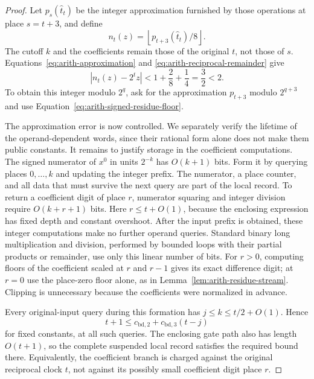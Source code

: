 \documentclass[11pt]{article}
\numberwithin{equation}{section}
\theoremstyle{definition}
\theoremstyle{remark}
\begin{document}
\begin{proof}
Let ${p}_s(\widehat {t}_t)$ be the integer approximation furnished by
those operations at place $s=t+3$, and define
\begin{equation}
 {n}_t(z)=\left\lfloor {p}_{t+3}(\widehat {t}_t)/8\right\rfloor.
 \label{eq:arith-reciprocal-approximation}
\end{equation}
The cutoff $k$ and the coefficients remain those of the original $t$,
not those of $s$.  Equations~\eqref{eq:arith-approximation} and
\eqref{eq:arith-reciprocal-remainder} give
\[
 |{n}_t(z)-2^tz|<1+\frac28+\frac14=\frac32<2.
\]
To obtain this integer modulo $2^q$, ask for the approximation
${p}_{t+3}$ modulo $2^{q+3}$ and use
Equation~\eqref{eq:arith-signed-residue-floor}.

The approximation error is now controlled. We separately verify the lifetime of the operand-dependent words, since their rational form alone does not make them public constants. It remains to justify storage in the coefficient computations.
The signed numerator of $x^0$ in units $2^{-k}$ has $O(k+1)$
bits.  Form it by querying places $0,\ldots,k$ and updating the
integer prefix.  The numerator, a place counter, and all data that
must survive the next query are part of the local record.
To return a coefficient digit of place $r$, numerator squaring and
integer division require $O(k+r+1)$ bits.  Here $r\leq t+O(1)$,
because the enclosing expression has fixed depth and constant
overshoot.  After the input prefix is obtained, these integer
computations make no further operand queries.  Standard binary
long multiplication and division, performed by bounded loops with
their partial products or remainder, use only this linear number
of bits.  For $r>0$, computing floors of the coefficient scaled at
$r$ and $r-1$ gives its exact difference digit; at $r=0$ use the
place-zero floor alone, as in Lemma~\ref{lem:arith-residue-stream}.
Clipping is unnecessary
because the coefficients were normalized in advance.

Every original-input query during this formation has
$j\leq k\leq t/2+O(1)$.  Hence
\begin{equation}
 t+1\leq {c_{\mathrm{bd},2}}+{c_{\mathrm{bd},3}}(t-j)
 \label{eq:arith-early-word-payment}
\end{equation}
for fixed constants, at all such queries.  The enclosing gate path
also has length $O(t+1)$, so the complete suspended local record
satisfies the required bound there.  Equivalently, the coefficient
branch is charged against the original reciprocal clock $t$, not
against its possibly small coefficient digit place $r$.


\end{proof}
\end{document}
